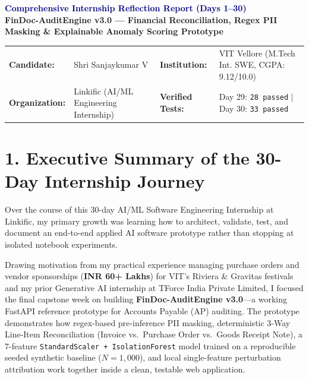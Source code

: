 \documentclass[a4paper,10pt]{article}
\begin{document}
\begin{center}
    {\fontsize{16}{20}\selectfont\bfseries\textcolor{navy}{Comprehensive Internship Reflection Report (Days 1--30)}}\\[4pt]
    {\fontsize{10.5}{13}\selectfont\textbf{FinDoc-AuditEngine v3.0 --- Financial Reconciliation, Regex PII Masking \& Explainable Anomaly Scoring Prototype}}\\[6pt]
\end{center}

\begin{tabularx}{\textwidth}{@{}lXlX@{}}
\toprule
\textbf{Candidate:} & Shri Sanjaykumar V & \textbf{Institution:} & VIT Vellore (M.Tech Int. SWE, CGPA: 9.12/10.0) \\
\textbf{Organization:} & Linkific (AI/ML Engineering Internship) & \textbf{Verified Tests:} & Day 29: \texttt{28 passed} $|$ Day 30: \texttt{33 passed} \\
\bottomrule
\end{tabularx}

\section{1. Executive Summary of the 30-Day Internship Journey}
Over the course of this 30-day AI/ML Software Engineering Internship at Linkific, my primary growth was learning how to architect, validate, test, and document an end-to-end applied AI software prototype rather than stopping at isolated notebook experiments.

Drawing motivation from my practical experience managing purchase orders and vendor sponsorships (\textbf{INR 60+ Lakhs}) for VIT's Riviera \& Gravitas festivals and my prior Generative AI internship at TForce India Private Limited, I focused the final capstone week on building \textbf{FinDoc-AuditEngine v3.0}---a working FastAPI reference prototype for Accounts Payable (AP) auditing. The prototype demonstrates how regex-based pre-inference PII masking, deterministic 3-Way Line-Item Reconciliation (Invoice vs.\ Purchase Order vs.\ Goods Receipt Note), a 7-feature \texttt{StandardScaler + IsolationForest} model trained on a reproducible seeded synthetic baseline ($N=1{,}000$), and local single-feature perturbation attribution work together inside a clean, testable web application.
\end{document}
